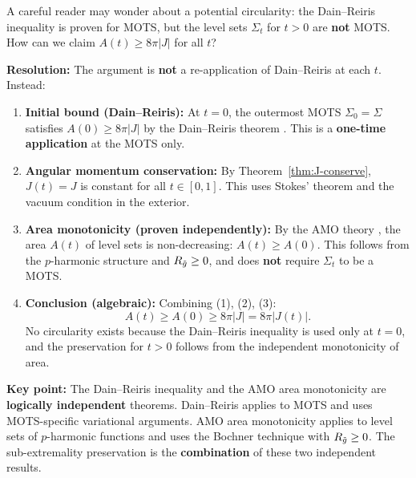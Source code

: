 \begin{remark}\label{rem:bootstrap-clarification}
A careful reader may wonder about a potential circularity: the Dain--Reiris inequality is proven for MOTS, but the level sets $\Sigma_t$ for $t > 0$ are \textbf{not} MOTS. How can we claim $A(t) \geq 8\pi|J|$ for all $t$?

\textbf{Resolution:} The argument is \textbf{not} a re-application of Dain--Reiris at each $t$. Instead:
\begin{enumerate}
    \item[(1)] \textbf{Initial bound (Dain--Reiris):} At $t = 0$, the outermost MOTS $\Sigma_0 = \Sigma$ satisfies $A(0) \geq 8\pi|J|$ by the Dain--Reiris theorem \cite{dain2011}. This is a \textbf{one-time application} at the MOTS only.
    
    \item[(2)] \textbf{Angular momentum conservation:} By Theorem~\ref{thm:J-conserve}, $J(t) = J$ is constant for all $t \in [0,1]$. This uses Stokes' theorem and the vacuum condition in the exterior.
    
    \item[(3)] \textbf{Area monotonicity (proven independently):} By the AMO theory \cite{amo2022}, the area $A(t)$ of level sets is non-decreasing: $A(t) \geq A(0)$. This follows from the $p$-harmonic structure and $R_{\tilde{g}} \geq 0$, and does \textbf{not} require $\Sigma_t$ to be a MOTS.
    
    \item[(4)] \textbf{Conclusion (algebraic):} Combining (1), (2), (3):
    \[
    A(t) \geq A(0) \geq 8\pi|J| = 8\pi|J(t)|.
    \]
    No circularity exists because the Dain--Reiris inequality is used only at $t = 0$, and the preservation for $t > 0$ follows from the independent monotonicity of area.
\end{enumerate}

\textbf{Key point:} The Dain--Reiris inequality and the AMO area monotonicity are \textbf{logically independent} theorems. Dain--Reiris applies to MOTS and uses MOTS-specific variational arguments. AMO area monotonicity applies to level sets of $p$-harmonic functions and uses the Bochner technique with $R_{\tilde{g}} \geq 0$. The sub-extremality preservation is the \textbf{combination} of these two independent results.
\end{remark}

